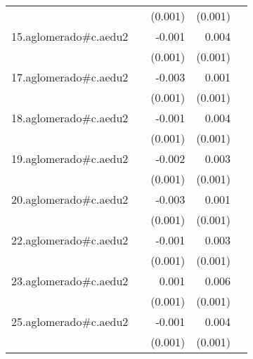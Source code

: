 {\begin{longtable}{l*{4}{D{.}{.}{-1}}}
            &                     &     (0.001)         &     (0.001)         &                     \\
\addlinespace
15.aglomerado#c.aedu2&                     &      -0.001         &       0.004\sym{***}&                     \\
            &                     &     (0.001)         &     (0.001)         &                     \\
\addlinespace
17.aglomerado#c.aedu2&                     &      -0.003\sym{*}  &       0.001         &                     \\
            &                     &     (0.001)         &     (0.001)         &                     \\
\addlinespace
18.aglomerado#c.aedu2&                     &      -0.001         &       0.004\sym{***}&                     \\
            &                     &     (0.001)         &     (0.001)         &                     \\
\addlinespace
19.aglomerado#c.aedu2&                     &      -0.002         &       0.003\sym{**} &                     \\
            &                     &     (0.001)         &     (0.001)         &                     \\
\addlinespace
20.aglomerado#c.aedu2&                     &      -0.003\sym{*}  &       0.001         &                     \\
            &                     &     (0.001)         &     (0.001)         &                     \\
\addlinespace
22.aglomerado#c.aedu2&                     &      -0.001         &       0.003\sym{***}&                     \\
            &                     &     (0.001)         &     (0.001)         &                     \\
\addlinespace
23.aglomerado#c.aedu2&                     &       0.001         &       0.006\sym{***}&                     \\
            &                     &     (0.001)         &     (0.001)         &                     \\
\addlinespace
25.aglomerado#c.aedu2&                     &      -0.001         &       0.004\sym{***}&                     \\
            &                     &     (0.001)         &     (0.001)         &                     \\

\end{longtable}}
